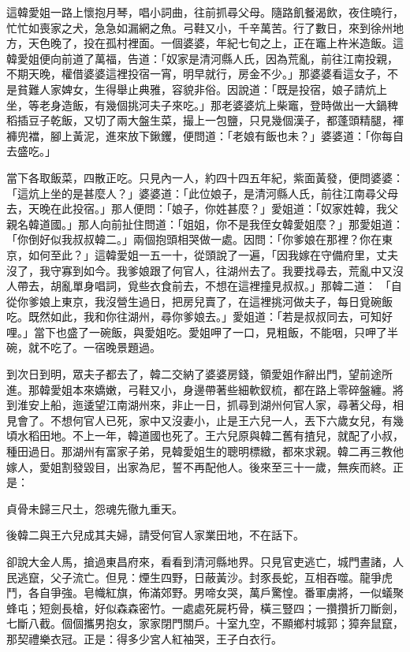 這韓愛姐一路上懷抱月琴，唱小詞曲，往前抓尋父母。隨路飢餐渴飲，夜住曉行，忙忙如喪家之犬，急急如漏網之魚。弓鞋又小，千辛萬苦。行了數日，來到徐州地方，天色晚了，投在孤村裡面。一個婆婆，年紀七旬之上，正在竈上杵米造飯。這韓愛姐便向前道了萬福，告道：「奴家是清河縣人氏，因為荒亂，前往江南投親，不期天晚，權借婆婆這裡投宿一宵，明早就行，房金不少。」那婆婆看這女子，不是貧難人家婢女，生得舉止典雅，容貌非俗。因說道：「既是投宿，娘子請炕上坐，等老身造飯，有幾個挑河夫子來吃。」那老婆婆炕上柴竈，登時做出一大鍋稗稻插豆子乾飯，又切了兩大盤生菜，撮上一包鹽，只見幾個漢子，都蓬頭精腿，褌褲兜襠，腳上黃泥，進來放下鍬钁，便問道：「老娘有飯也未？」婆婆道：「你每自去盛吃。」

當下各取飯菜，四散正吃。只見內一人，約四十四五年紀，紫面黃發，便問婆婆：「這炕上坐的是甚麼人？」婆婆道：「此位娘子，是清河縣人氏，前往江南尋父母去，天晚在此投宿。」那人便問：「娘子，你姓甚麼？」愛姐道：「奴家姓韓，我父親名韓道國。」那人向前扯住問道：「姐姐，你不是我侄女韓愛姐麼？」那愛姐道：「你倒好似我叔叔韓二。」兩個抱頭相哭做一處。因問：「你爹娘在那裡？你在東京，如何至此？」這韓愛姐一五一十，從頭說了一遍，「因我嫁在守備府里，丈夫沒了，我守寡到如今。我爹娘跟了何官人，往湖州去了。我要找尋去，荒亂中又沒人帶去，胡亂單身唱詞，覓些衣食前去，不想在這裡撞見叔叔。」那韓二道： 「自從你爹娘上東京，我沒營生過日，把房兒賣了，在這裡挑河做夫子，每日覓碗飯吃。既然如此，我和你往湖州，尋你爹娘去。」愛姐道：「若是叔叔同去，可知好哩。」當下也盛了一碗飯，與愛姐吃。愛姐呷了一口，見粗飯，不能咽，只呷了半碗，就不吃了。一宿晚景題過。

到次日到明，眾夫子都去了，韓二交納了婆婆房錢，領愛姐作辭出門，望前途所進。那韓愛姐本來嬌嫩，弓鞋又小，身邊帶著些細軟釵梳，都在路上零碎盤纏。將到淮安上船，迤逶望江南湖州來，非止一日，抓尋到湖州何官人家，尋著父母，相見會了。不想何官人已死，家中又沒妻小，止是王六兒一人，丟下六歲女兒，有幾頃水稻田地。不上一年，韓道國也死了。王六兒原與韓二舊有揸兒，就配了小叔，種田過日。那湖州有富家子弟，見韓愛姐生的聰明標緻，都來求親。韓二再三教他嫁人，愛姐割發毀目，出家為尼，誓不再配他人。後來至三十一歲，無疾而終。正是：

貞骨未歸三尺土，怨魂先徹九重天。

後韓二與王六兒成其夫婦，請受何官人家業田地，不在話下。

卻說大金人馬，搶過東昌府來，看看到清河縣地界。只見官吏逃亡，城門晝諸，人民逃竄，父子流亡。但見：煙生四野，日蔽黃沙。封豕長蛇，互相吞噬。龍爭虎鬥，各自爭強。皂幟紅旗，佈滿郊野。男啼女哭，萬戶驚惶。番軍虜將，一似蟻聚蜂屯；短劍長槍，好似森森密竹。一處處死屍朽骨，橫三豎四；一攢攢折刀斷劍，七斷八截。個個攜男抱女，家家閉門關戶。十室九空，不顯鄉村城郭；獐奔鼠竄，那契禮樂衣冠。正是：得多少宮人紅袖哭，王子白衣行。

